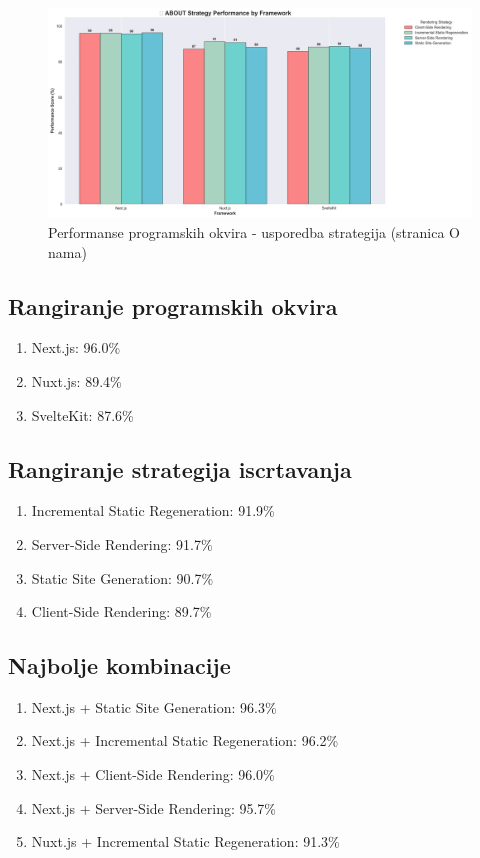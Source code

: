 \begin{figure}[H]
    \centering
    \includegraphics[width=\textwidth]{slike/rezultati/about/about_strategy_comparison.png}
    \caption{Performanse programskih okvira - usporedba strategija (stranica O nama)}
    \label{fig:testiranje-o-nama-usporedba-strategija}
\end{figure}

\newpage

\subsection{Rangiranje programskih okvira}
\begin{enumerate}
    \item Next.js: 96.0\%
    \item Nuxt.js: 89.4\%
    \item SvelteKit: 87.6\%
\end{enumerate}

\subsection{Rangiranje strategija iscrtavanja}
\begin{enumerate}
    \item Incremental Static Regeneration: 91.9\%
    \item Server-Side Rendering: 91.7\%
    \item Static Site Generation: 90.7\%
    \item Client-Side Rendering: 89.7\%
\end{enumerate}

\subsection{Najbolje kombinacije}
\begin{enumerate}
    \item Next.js + Static Site Generation: 96.3\%
    \item Next.js + Incremental Static Regeneration: 96.2\%
    \item Next.js + Client-Side Rendering: 96.0\%
    \item Next.js + Server-Side Rendering: 95.7\%
    \item Nuxt.js + Incremental Static Regeneration: 91.3\%
\end{enumerate}

